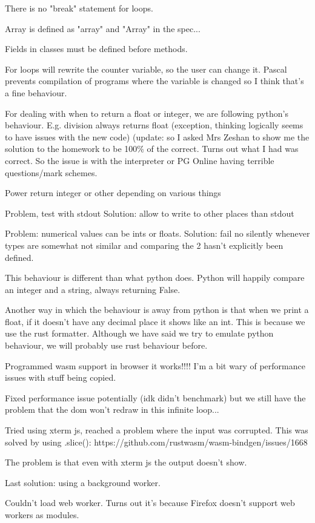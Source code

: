 \documentclass{article}
\begin{document}
There is no "break" statement for loops.

Array is defined as "array" and "Array" in the spec...

Fields in classes must be defined before methods.

For loops will rewrite the counter variable, so the user can change it.
Pascal prevents compilation of programs where the variable is changed so I
think that's a fine behaviour.

For dealing with when to return a float or integer, we are following python's
behaviour. E.g. division always returns float (exception, thinking logically
seems to have issues with the new code) (update: so I asked Mrs Zeshan to show
me the solution to the homework to be 100\% of the correct. Turns out what I
had was correct. So the issue is with the interpreter or PG Online having
terrible questions/mark schemes.

Power return integer or other depending on various things

Problem, test with stdout
Solution: allow to write to other places than stdout

Problem: numerical values can be ints or floats.
Solution: fail no silently whenever types are somewhat not similar and
comparing the 2 hasn't explicitly been defined.

This behaviour is different than what python does. Python will happily compare
an integer and a string, always returning False.

Another way in which the behaviour is away from python is that when we print a
float, if it doesn't have any decimal place it shows like an int. This is
because we use the rust formatter. Although we have said we try to emulate
python behaviour, we will probably use rust behaviour before.

Programmed wasm support in browser it works!!!! I'm a bit wary of performance
issues with stuff being copied.

Fixed performance issue potentially (idk didn't benchmark) but we still have
the problem that the dom won't redraw in this infinite loop...

Tried using xterm js, reached a problem where the input was corrupted. This was
solved by using .slice(): https://github.com/rustwasm/wasm-bindgen/issues/1668

The problem is that even with xterm js the output doesn't show.

Last solution: using a background worker.

Couldn't load web worker. Turns out it's because Firefox doesn't support web
workers as modules.
\end{document}
